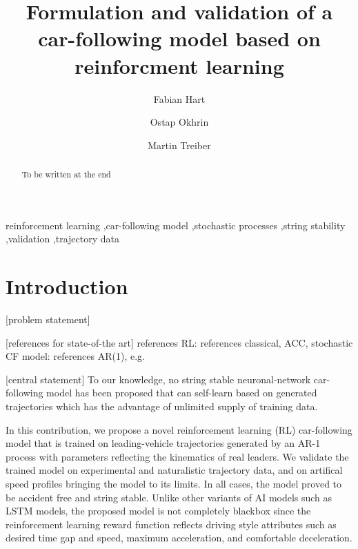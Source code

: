 \documentclass[review]{elsarticle}
\begin{document}
\begin{frontmatter}

\title{Formulation and validation of a car-following model based on
  reinforcment learning}


\author[firstAddress]{Fabian Hart}
\author[firstAddress,secondAddress]{Ostap Okhrin}
\author[firstAddress,secondAddress]{Martin Treiber}

\address[firstAddress]{TU Dresden}
\address[secondAddress]{Possible second address}




\begin{abstract}
To be written at the end
\end{abstract}

\begin{keyword}
reinforcement learning \sep car-following model \sep stochastic
processes \sep string stability \sep validation \sep trajectory data 
\end{keyword}

\end{frontmatter}


\section{Introduction}

[problem statement]

[references for state-of-the art]
references RL: \cite{farazi2020deep,qu2020jointly}
references classical, ACC, stochastic CF model: 
\cite{Opus,TreiberKesting-Book,Treiber2018stochIDM_TRB}
references AR(1), e.g. \cite{HonerkampEngl}


[central statement] To our knowledge, no string stable
neuronal-network car-following model has been proposed 
that can self-learn based on
generated trajectories which has the advantage of unlimited supply of
training data. 

In this contribution, we propose a novel reinforcement learning (RL)
car-following model that is trained on leading-vehicle trajectories
generated
by an AR-1 process with parameters reflecting the kinematics of real
leaders. We validate the trained model on experimental and
naturalistic trajectory data, and on artifical speed profiles
bringing the 
model to its limits. In all cases, the model proved to be accident
free and  string stable. Unlike
other variants of AI models such as LSTM models, the proposed model is
not completely blackbox since the reinforcement learning reward
function reflects driving style attributes such as desired time gap and
speed, maximum acceleration, and comfortable deceleration. 
\end{document}
